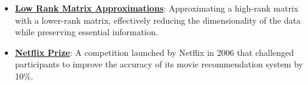 \documentclass{article}%
\begin{document}
\begin{itemize}[leftmargin=*]
\item \href{https://purdue.brightspace.com/d2l/common/assets/pdfjs-d2l-dist/1.0.14-legacy/web/viewer.html?file=\%2Fcontent\%2Fenforced\%2F1095465-WL.202510.CS24200.LE1\%2F242-19-svd-pca.pdf\%3Fou\%3D1095465\&lang=en-us\&container=d2l-fileviewer-rendered-pdf\&fullscreen=d2l-fileviewer-rendered-pdf-dialog\&height=667#page=9}{\textbf{Low Rank Matrix Approximations}}: Approximating a high-rank matrix with a lower-rank matrix, effectively reducing the dimensionality of the data while preserving essential information.%
\item \href{https://purdue.brightspace.com/d2l/common/assets/pdfjs-d2l-dist/1.0.14-legacy/web/viewer.html?file=\%2Fcontent\%2Fenforced\%2F1095465-WL.202510.CS24200.LE1\%2F242-19-svd-pca.pdf\%3Fou\%3D1095465\&lang=en-us\&container=d2l-fileviewer-rendered-pdf\&fullscreen=d2l-fileviewer-rendered-pdf-dialog\&height=667#page=41}{\textbf{Netflix Prize}}: A competition launched by Netflix in 2006 that challenged participants to improve the accuracy of its movie recommendation system by 10\%.%
\end{itemize}

%
\end{document}
